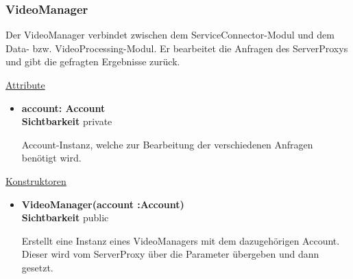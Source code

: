\subsubsection{VideoManager} \label{service:klasse:VideoManager}
Der VideoManager verbindet zwischen dem ServiceConnector-Modul und dem Data- bzw. VideoProcessing-Modul. Er bearbeitet die Anfragen des ServerProxys und gibt die gefragten Ergebnisse zurück.\newline

\underline{Attribute}
\begin{itemize}
\itemsep0pt
\item \textbf{account: Account} \hfill\\ 
\textbf{Sichtbarkeit} private 

Account-Instanz, welche zur Bearbeitung der verschiedenen Anfragen benötigt wird.

\end{itemize}

\underline{Konstruktoren}
\begin{itemize}
\itemsep0pt
\item \textbf{VideoManager(account :Account)} \hfill\\
\textbf{Sichtbarkeit} public

Erstellt eine Instanz eines VideoManagers mit dem dazugehörigen Account. Dieser wird vom ServerProxy über die Parameter übergeben und dann gesetzt.
\end{itemize}

